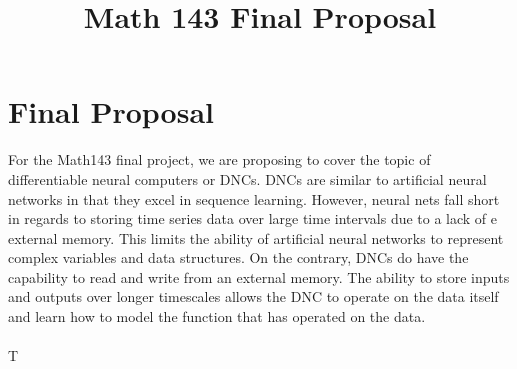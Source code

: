 \documentclass[11pt,letterpaper,cm]{hmcpset}
\title{Math 143 Final Proposal}
\begin{document}
\section{Final Proposal}
For the Math143 final project, we are proposing to cover the topic of differentiable neural computers or DNCs.
DNCs are similar to artificial neural networks in that they excel in sequence learning. 
However, neural nets fall short in regards to storing time series data over large time intervals due to a lack of e external memory. 
This limits the ability of artificial neural networks to represent complex variables and data structures. 
On the contrary, DNCs do have the capability to read and write from an external memory.
The ability to store inputs and outputs over longer timescales allows the DNC to operate on the data itself and learn how to model the function that has operated on the data.
\\
\\
T
\end{document}
